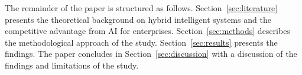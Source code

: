 The remainder of the paper is structured as follows. Section~\ref{sec:literature} presents the theoretical
background on hybrid intelligent systems and the competitive advantage from AI for enterprises. Section~\ref{sec:methods}
describes the methodological approach of the study. Section~\ref{sec:results} presents the findings. The paper
concludes in Section~\ref{sec:discussion} with a discussion of the findings and limitations of the study.